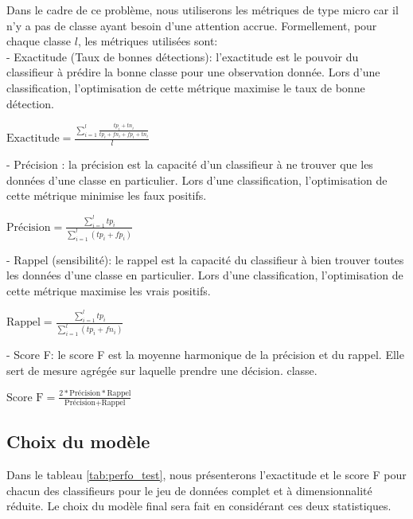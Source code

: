 Dans le cadre de ce problème, nous utiliserons les métriques de type micro car il n'y a pas de classe ayant besoin d'une attention accrue. Formellement, pour chaque classe $l$, les métriques utilisées sont: \\

- Exactitude (Taux de bonnes détections): l'exactitude est le pouvoir du classifieur à prédire la bonne classe pour une observation donnée.  Lors d'une classification, l'optimisation de cette métrique maximise le taux de bonne détection.\\
\begin{center}
	$\textrm{Exactitude} = \frac{\sum_{i=1}^{l} \frac{tp_i +tn_i}{tp_i + fn_i + fp_i+ tn_i}}{l}$
\end{center}

- Précision : la précision est la capacité d'un classifieur à ne trouver que les données d'une classe en particulier. Lors d'une classification, l'optimisation de cette métrique minimise les faux positifs.\\
\begin{center}
	$\textrm{Précision} = \frac{\sum_{i=1}^{l} tp_i}{\sum_{i=1}^{l} (tp_i + fp_i)}$
\end{center}

- Rappel (sensibilité): le rappel est la capacité du classifieur à bien trouver toutes les données d'une classe en particulier. Lors d'une classification, l'optimisation de cette métrique maximise les vrais positifs.\\
\begin{center}
	$\textrm{Rappel} = \frac{\sum_{i=1}^{l} tp_i}{\sum_{i=1}^{l} (tp_i + fn_i)}$
\end{center}

- Score F: le score F est la moyenne harmonique de la précision et du rappel. Elle sert de mesure agrégée sur laquelle prendre une décision. classe.\\	
\begin{center}
	$\textrm{Score F} = \frac{2 * \textrm{Précision} * \textrm{Rappel}}{\textrm{Précision} + \textrm{Rappel}}$ 
\end{center}

\subsection{Choix du modèle}

Dans le tableau \ref{tab:perfo_test}, nous présenterons l'exactitude et le score F pour chacun des classifieurs pour le jeu de données complet et à dimensionnalité réduite. Le choix du modèle final sera fait en considérant ces deux statistiques. \\

